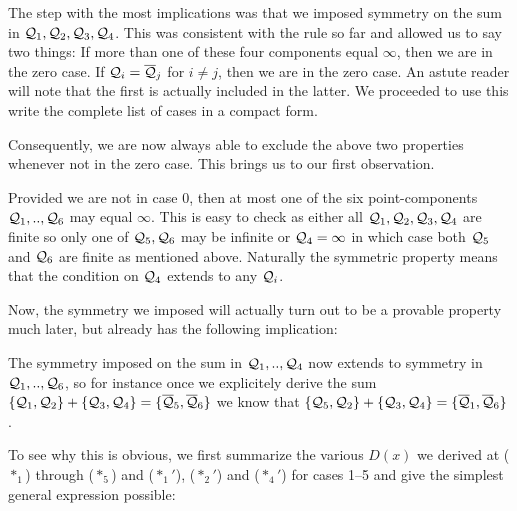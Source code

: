 \documentclass[english,11pt,a4paper]{article}
\begin{document}
The step with the most implications was that we imposed symmetry on the sum in $\mathcal{Q}_1, \mathcal{Q}_2, \mathcal{Q}_3, \mathcal{Q}_4$. This was consistent with the rule so far and allowed us to say two things: If more than one of these four components equal $\infty$, then we are in the zero case. If $\mathcal{Q}_i = \overline {\mathcal{Q}}_j$ for $i \neq j$, then we are in the zero case. An astute reader will note that the first is actually included in the latter. We proceeded to use this write the complete list of cases in a compact form.

Consequently, we are now always able to exclude the above two properties whenever not in the zero case. This brings us to our first observation.

\begin{remark}
  Provided we are not in case 0, then at most one of the six point-components $\mathcal{Q}_1,..,\mathcal{Q}_6$ may equal $\infty$. This is easy to check as either all $\mathcal{Q}_1, \mathcal{Q}_2, \mathcal{Q}_3, \mathcal{Q}_4$ are finite so only one of $\mathcal{Q}_5, \mathcal{Q}_6$ may be infinite or $\mathcal{Q}_4 = \infty$ in which case both $\mathcal{Q}_5$ and $\mathcal{Q}_6$ are finite as mentioned above. Naturally the symmetric property means that the condition on $\mathcal{Q}_4$ extends to any $\mathcal{Q}_i$.
\end{remark}

Now, the symmetry we imposed will actually turn out to be a provable property much later, but already has the following implication:

\begin{remark}\label{symall}
  The symmetry imposed on the sum in $\mathcal{Q}_1, .., \mathcal{Q}_4$ now extends to symmetry in $\mathcal{Q}_1, .., \mathcal{Q}_6$, so for instance once we explicitely derive the sum $\{\mathcal{Q}_1, \mathcal{Q}_2 \} +\{ \mathcal{Q}_3 , \mathcal{Q}_4 \} = \{\overline {\mathcal{Q}}_5 , \overline {\mathcal{Q}}_6\}$ we know that $\{\mathcal{Q}_5, \mathcal{Q}_2 \} +\{ \mathcal{Q}_3 , \mathcal{Q}_4 \} = \{\overline {\mathcal{Q}}_1 , \overline {\mathcal{Q}}_6\}$.
\end{remark}

To see why this is obvious, we first summarize the various $D(x)$ we derived at ($*_1$) through ($*_5$) and ($*_1'$), ($*_2'$) and ($*_4'$) for cases 1--5 and give the simplest general expression possible:
\end{document}
